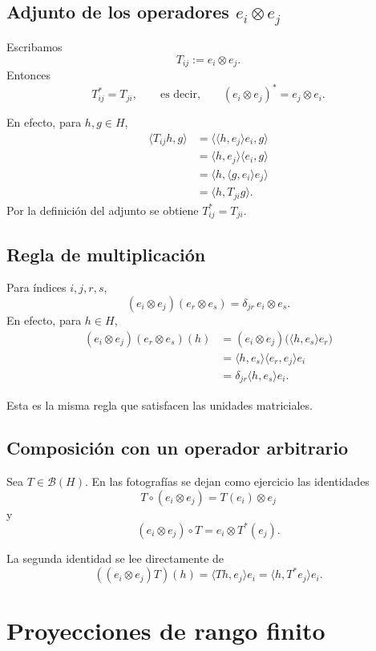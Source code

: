 \documentclass[11pt]{article}
\newcommand{\BH}{\mathcal{B}(H)}
\begin{document}
\subsection{Adjunto de los operadores $e_i\otimes e_j$}

Escribamos
\[
T_{ij}:=e_i\otimes e_j.
\]
Entonces
\[
T_{ij}^*=T_{ji},
\qquad\text{es decir,}\qquad
(e_i\otimes e_j)^*=e_j\otimes e_i.
\]

En efecto, para $h,g\in H$,
\begin{align*}
\langle T_{ij}h,g\rangle
 &=\langle \langle h,e_j\rangle e_i,g\rangle\\
 &=\langle h,e_j\rangle\langle e_i,g\rangle\\
 &=\langle h,\langle g,e_i\rangle e_j\rangle\\
 &=\langle h,T_{ji}g\rangle.
\end{align*}
Por la definición del adjunto se obtiene $T_{ij}^*=T_{ji}$.

\subsection{Regla de multiplicación}

Para índices $i,j,r,s$,
\[
(e_i\otimes e_j)(e_r\otimes e_s)
=
\delta_{jr}\,e_i\otimes e_s.
\]
En efecto, para $h\in H$,
\begin{align*}
(e_i\otimes e_j)(e_r\otimes e_s)(h)
 &= (e_i\otimes e_j)\bigl(\langle h,e_s\rangle e_r\bigr)\\
 &=\langle h,e_s\rangle\langle e_r,e_j\rangle e_i\\
 &=\delta_{jr}\langle h,e_s\rangle e_i.
\end{align*}

Esta es la misma regla que satisfacen las unidades matriciales.

\subsection{Composición con un operador arbitrario}

Sea $T\in\BH$. En las fotografías se dejan como ejercicio las identidades
\[
T\circ(e_i\otimes e_j)=T(e_i)\otimes e_j
\]
y
\[
(e_i\otimes e_j)\circ T=e_i\otimes T^*(e_j).
\]

La segunda identidad se lee directamente de
\[
((e_i\otimes e_j)T)(h)
 =\langle Th,e_j\rangle e_i
 =\langle h,T^*e_j\rangle e_i.
\]

\section{Proyecciones de rango finito}
\end{document}
